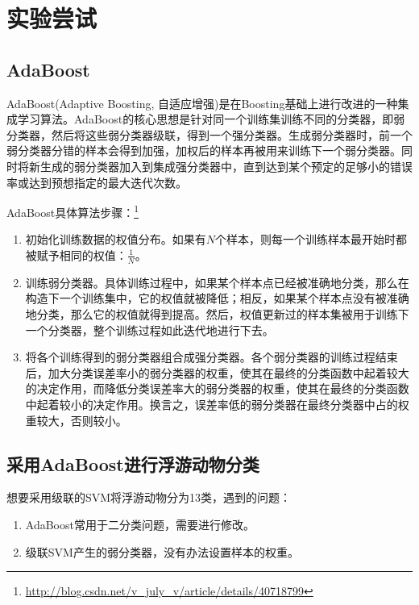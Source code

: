 \section{实验尝试}

\subsection{AdaBoost}
AdaBoost(Adaptive Boosting, 自适应增强)是在Boosting基础上进行改进的一种集成学习算法。AdaBoost的核心思想是针对同一个训练集训练不同的分类器，即弱分类器，然后将这些弱分类器级联，得到一个强分类器。生成弱分类器时，前一个弱分类器分错的样本会得到加强，加权后的样本再被用来训练下一个弱分类器。同时将新生成的弱分类器加入到集成强分类器中，直到达到某个预定的足够小的错误率或达到预想指定的最大迭代次数。

AdaBoost具体算法步骤：\footnote{\url{http://blog.csdn.net/v_july_v/article/details/40718799}}
\begin{enumerate}
\item 初始化训练数据的权值分布。如果有$N$个样本，则每一个训练样本最开始时都被赋予相同的权值：$\frac{1}{N}$。
\item 训练弱分类器。具体训练过程中，如果某个样本点已经被准确地分类，那么在构造下一个训练集中，它的权值就被降低；相反，如果某个样本点没有被准确地分类，那么它的权值就得到提高。然后，权值更新过的样本集被用于训练下一个分类器，整个训练过程如此迭代地进行下去。
\item 将各个训练得到的弱分类器组合成强分类器。各个弱分类器的训练过程结束后，加大分类误差率小的弱分类器的权重，使其在最终的分类函数中起着较大的决定作用，而降低分类误差率大的弱分类器的权重，使其在最终的分类函数中起着较小的决定作用。换言之，误差率低的弱分类器在最终分类器中占的权重较大，否则较小。
\end{enumerate}

\subsection{采用AdaBoost进行浮游动物分类}
想要采用级联的SVM将浮游动物分为13类，遇到的问题：
\begin{enumerate}
\item AdaBoost常用于二分类问题，需要进行修改。
\item 级联SVM产生的弱分类器，没有办法设置样本的权重。
\end{enumerate}